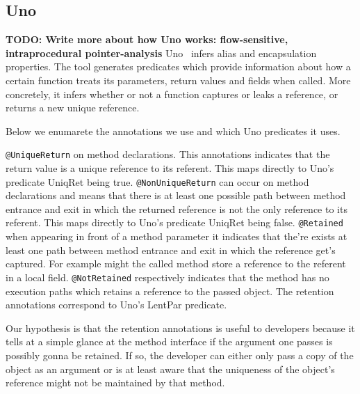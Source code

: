 

\subsection{Uno}

{\bf\large TODO: Write more about how Uno works: flow-sensitive, intraprocedural 
pointer-analysis}
Uno~\cite{Uno} infers alias and encapsulation properties. The
tool generates predicates which provide information about how a certain
function treats its parameters, return values and fields when called. More
concretely, it infers whether or not a function captures or leaks a
reference, or returns a new unique reference.

Below we enumarete the annotations we use and which Uno predicates it uses.

\texttt{@UniqueReturn} on method declarations. This annotations indicates 
that the return value is a unique reference to its referent. This maps directly
to Uno's predicate UniqRet being true.
\texttt{@NonUniqueReturn} can occur on method declarations and means that 
there is at least one possible path between method entrance and exit in
which the returned reference is not the only reference to its referent.
This maps directly to Uno's predicate UniqRet being false.
\texttt{@Retained} when appearing in front of a method parameter it indicates
that the're exists at least one path between method entrance and exit in 
which the reference get's captured. For example might the called method store
a reference to the referent in a local field.
\texttt{@NotRetained} respectively indicates that the method has no execution 
paths which retains a reference to the passed object.
The retention annotations correspond to Uno's LentPar predicate.

Our hypothesis is that the retention annotations is useful to developers
because it tells at a simple glance at the method interface if the argument
one passes is possibly gonna be retained. If so, the developer can either only
pass a copy of the object as an argument or is at least aware that the uniqueness
of the object's reference might not be maintained by that method.

